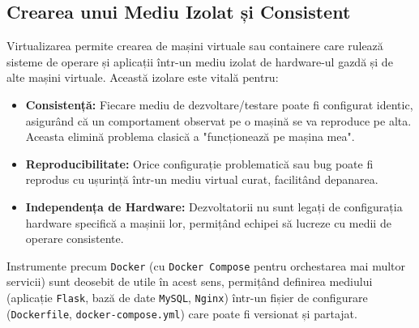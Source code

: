 \documentclass[12pt, a4paper, oneside, romanian]{teza-upb}
\begin{document}
\subsection{Crearea unui Mediu Izolat și Consistent}
Virtualizarea permite crearea de mașini virtuale sau containere care rulează sisteme de operare și aplicații într-un mediu izolat de hardware-ul gazdă și de alte mașini virtuale. Această izolare este vitală pentru:
\begin{itemize}
	\item \textbf{Consistență:} Fiecare mediu de dezvoltare/testare poate fi configurat identic, asigurând că un comportament observat pe o mașină se va reproduce pe alta. Aceasta elimină problema clasică a "funcționează pe mașina mea".
	\item \textbf{Reproducibilitate:} Orice configurație problematică sau bug poate fi reprodus cu ușurință într-un mediu virtual curat, facilitând depanarea.
	\item \textbf{Independența de Hardware:} Dezvoltatorii nu sunt legați de configurația hardware specifică a mașinii lor, permițând echipei să lucreze cu medii de operare consistente.
\end{itemize}
Instrumente precum \texttt{Docker} (cu \texttt{Docker Compose} pentru orchestarea mai multor servicii) sunt deosebit de utile în acest sens, permițând definirea mediului (aplicație \texttt{Flask}, bază de date \texttt{MySQL}, \texttt{Nginx}) într-un fișier de configurare (\texttt{Dockerfile}, \texttt{docker-compose.yml}) care poate fi versionat și partajat.
\end{document}
